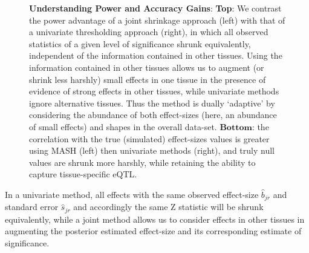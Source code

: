 \begin{figure}[htbp]
\caption{\textbf{Understanding Power and Accuracy Gains}: \textbf{Top}: We contrast the power advantage of a joint shrinkage approach (left) with that of a univariate thresholding approach (right), in which all observed statistics of a given level of significance shrunk equivalently, independent of the information contained in other tissues. Using the information contained in other tissues allows us to augment (or shrink less harshly) small effects in one tissue in the presence of evidence of strong effects in other tissues, while univariate methods ignore alternative tissues. Thus the method is dually `adaptive' by considering the abundance of both effect-sizes (here, an abundance of small effects) and shapes in the overall data-set. $\textbf{Bottom}$: the correlation with the true (simulated) effect-sizes values is greater using MASH (left) then univariate methods (right), and truly null values are shrunk more harshly, while retaining the ability to capture tissue-specific eQTL.}
 \label{fig:simulationscatter}
\end{figure}\newline
%
In a univariate method, all effects with the same observed effect-size $\hat{b}_{jr}$ and standard error $\hat{s}_{jr}$ and accordingly the same Z statistic will be shrunk equivalently, while a joint method allows us to consider effects in other tissues in augmenting the posterior estimated effect-size and its corresponding estimate of significance.
